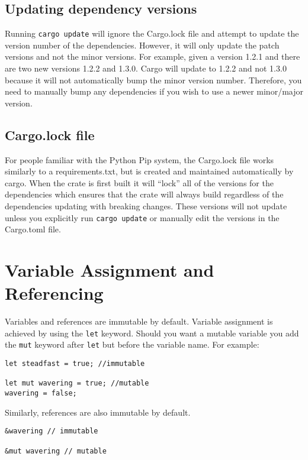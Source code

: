 \documentclass[12pt,notitlepage]{article}
\begin{document}
\subsection{Updating dependency versions}

Running \lstinline{cargo update} will ignore the Cargo.lock file and attempt to
update the version number of the dependencies. However, it will only update the
patch versions and not the minor versions. For example, given a version 1.2.1
and there are two new versions 1.2.2 and 1.3.0. Cargo will update to 1.2.2 and
not 1.3.0 because it will not automatically bump the minor version number.
Therefore, you need to manually bump any dependencies if you wish to use a
newer minor/major version.

\subsection{Cargo.lock file}

For people familiar with the Python Pip system, the Cargo.lock file works
similarly to a requirements.txt, but is created and maintained automatically by
cargo. When the crate is first built it will ``lock'' all of the versions for
the dependencies which ensures that the crate will always build regardless of
the dependencies updating with breaking changes. These versions will not update
unless you explicitly run \lstinline{cargo update} or manually edit the
versions in the Cargo.toml file.

\section{Variable Assignment and Referencing}

Variables and references are immutable by default. Variable assignment is
achieved by using the \lstinline{let} keyword. Should you want a mutable
variable you add the \lstinline{mut} keyword after \lstinline{let} but before
the variable name. For example:

\begin{lstlisting}
let steadfast = true; //immutable

let mut wavering = true; //mutable
wavering = false;

\end{lstlisting}

Similarly, references are also immutable by default.

\begin{lstlisting}
&wavering // immutable

&mut wavering // mutable
\end{lstlisting}
\end{document}
